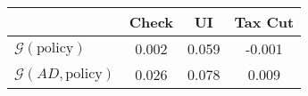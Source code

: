 \begin{tabular}{@{}lccc@{}}
\toprule
                          & Check      & UI    & Tax Cut    \\  \midrule
$\mathcal{G}(\text{policy})$ & 0.002  & 0.059  & -0.001     \\
$\mathcal{G}(AD,\text{policy})$ & 0.026  & 0.078  & 0.009     \\
\end{tabular}
